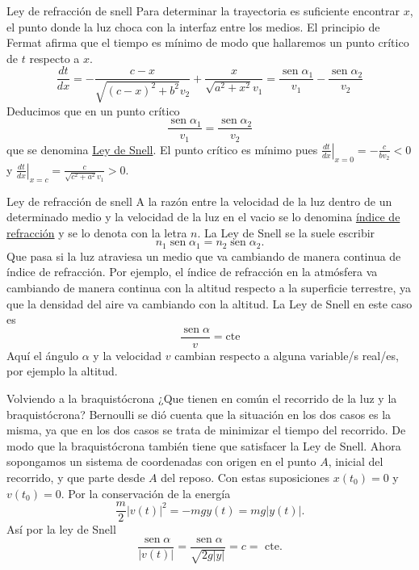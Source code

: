 \documentclass[handout,hyperref={colorlinks=true}]{beamer}
\DeclareMathOperator{\sen}{sen}
\newcommand{\nl}{\onslide<+-> }
\begin{document}
\begin{frame}{Ley de refracción de snell}
Para determinar la trayectoria es suficiente encontrar $x$, el punto donde la luz choca con la interfaz entre los medios. 
El principio de Fermat afirma que el tiempo es mínimo de modo que hallaremos un punto crítico de $t$ respecto a $x$. 
\[ \frac{dt}{dx}=-\frac{c - x}{\sqrt{{\left(c - x\right)}^{2} + b^{2}} v_{2}} +
\frac{x}{\sqrt{a^{2} + x^{2}} v_{1}}=\frac{\sen\alpha_1}{v_1}-\frac{\sen\alpha_2}{v_2} \]
Deducimos que en un punto crítico 
\[\boxed{\frac{\sen\alpha_1}{v_1}=\frac{\sen\alpha_2}{v_2} }\]
que se denomina \href{http://es.wikipedia.org/wiki/Ley_de_Snell}{Ley de Snell}. El punto crítico es mínimo pues $\left.\frac{dt}{dx}\right|_{x=0}=-\tfrac{c}{bv_2}<0$ y
$\left.\frac{dt}{dx}\right|_{x=c}=\tfrac{c}{\sqrt{c^2+a^2}v_1}>0$.

 
\end{frame}

\begin{frame}{Ley de refracción de snell}
\nl A la razón entre la velocidad de la luz dentro de un determinado medio y la velocidad de la luz en el vacio se lo denomina 
\href{http://es.wikipedia.org/wiki/Índice_de_refracción}{índice de refracción} y se lo denota con la letra $n$. La Ley de Snell se la suele escribir
\[\boxed{n_1\sen\alpha_1=n_2\sen\alpha_2 }.\]
Que pasa si la luz atraviesa un medio que va cambiando de manera continua de índice de refracción. Por ejemplo, el índice de refracción en la atmósfera
va cambiando de manera continua con la altitud respecto a la superficie terrestre, ya que la densidad del aire va cambiando con la altitud. La Ley de
Snell en este caso es
\[\boxed{\frac{\sen\alpha}{v}=\text{cte}}\]
Aquí el ángulo $\alpha$ y la velocidad $v$ cambian respecto a alguna variable/s real/es, por ejemplo la altitud.

\end{frame}


\begin{frame}{Volviendo a la braquistócrona}
\nl¿Que tienen en común el recorrido de la luz y la braquistócrona? Bernoulli se dió cuenta que la situación en los dos casos es la misma, ya que en los dos casos 
se trata de minimizar el tiempo del recorrido. De modo que la braquistócrona también tiene que satisfacer la Ley de Snell.\newline  
\nl Ahora sopongamos un sistema de coordenadas con origen en el punto $A$, inicial del recorrido, y que parte desde $A$   
del reposo. Con estas suposiciones $x(t_0)=0$ y $v(t_0)=0$. Por la conservación de la energía 
\[\frac{m}{2}|v(t)|^2=-mgy(t)=mg|y(t)|.\]
\nl Así por la ley de Snell
\[\frac{\sen\alpha}{|v(t)|}=\frac{\sen\alpha}{\sqrt{2g|y|}}=c=\text{ cte}.\]

  \end{frame}
\end{document}
